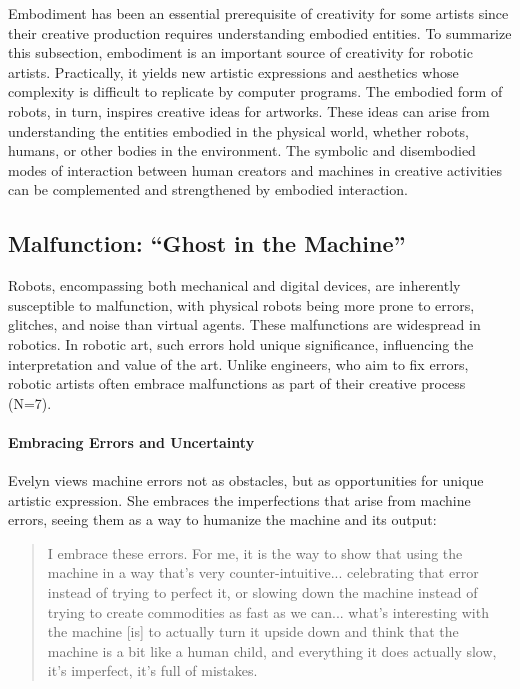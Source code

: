 Embodiment has been an essential prerequisite of creativity for some artists since their creative production requires understanding embodied entities. To summarize this subsection, embodiment is an important source of creativity for robotic artists. Practically, it yields new artistic expressions and aesthetics whose complexity is difficult to replicate by computer programs. The embodied form of robots, in turn,  inspires creative ideas for artworks. These ideas can arise from understanding the entities embodied in the physical world, whether robots, humans, or other bodies in the environment. The symbolic and disembodied modes of interaction between human creators and machines in creative activities can be complemented and strengthened by embodied interaction.

\subsection{Malfunction: ``Ghost in the Machine''}
Robots, encompassing both mechanical and digital devices, are inherently susceptible to malfunction, with physical robots being more prone to errors, glitches, and noise than virtual agents. These malfunctions are widespread in robotics. In robotic art, such errors hold unique significance, influencing the interpretation and value of the art. Unlike engineers, who aim to fix errors, robotic artists often embrace malfunctions as part of their creative process (N=7).

\paragraph{Embracing Errors and Uncertainty}
Evelyn views machine errors not as obstacles, but as opportunities for unique artistic expression. She embraces the imperfections that arise from machine errors, seeing them as a way to humanize the machine and its output:

\begin{quote}
     I embrace these errors. For me, it is the way to show that using the machine in a way that's very counter-intuitive... celebrating that error instead of trying to perfect it, or slowing down the machine instead of trying to create commodities as fast as we can... what's interesting with the machine [is] to actually turn it upside down and think that the machine is a bit like a human child, and everything it does actually slow, it's imperfect, it's full of mistakes.
\end{quote}

